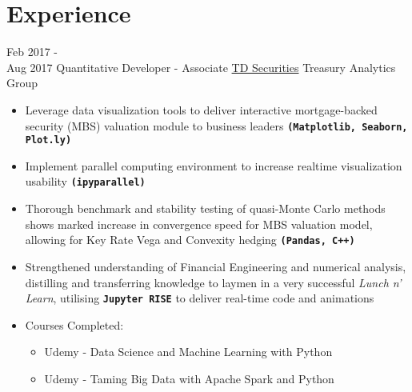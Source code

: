 \documentclass[letterpaper]{twentysecondcv} %
\begin{document}
\makeprofile %

\newcommand{\skill}[1]{\texttt{\textbf{#1}}}


\section{Experience}

\begin{twenty} %

	\twentyitem
    	{Feb 2017 - \\ Aug 2017}
        {Quantitative Developer - Associate}
        {\href{http://www.td.com/}{TD Securities}}
        {Treasury Analytics Group}
        {
        {\begin{itemize}
		\item Leverage data visualization tools to deliver interactive mortgage-backed security (MBS) valuation module to business leaders \skill{(Matplotlib, Seaborn, Plot.ly)}
		\item Implement parallel computing environment to increase realtime visualization usability \skill{(ipyparallel)}
        \item Thorough benchmark and stability testing of quasi-Monte Carlo methods shows marked increase in convergence speed for MBS valuation model, allowing for Key Rate Vega and Convexity hedging \skill{(Pandas, C++)}
        \item Strengthened understanding of Financial Engineering and numerical analysis, distilling and transferring knowledge to laymen in a very successful \emph{Lunch n' Learn}, utilising \skill{Jupyter RISE} to deliver real-time code and animations
        \item Courses Completed: 
        \begin{itemize}
        	\item Udemy - Data Science and Machine Learning with Python
        	\item Udemy - Taming Big Data with Apache Spark and Python
        \end{itemize}
    \end{itemize}}
        }
        


\end{twenty}
\end{document}
